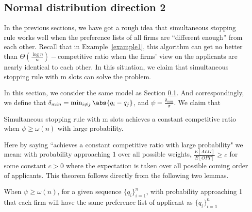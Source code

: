 \subsection{Normal distribution direction 2}


In the previous sections, we have got a rough idea that simultaneous stopping rule works well when the preference lists of all firms are ``different enough'' from each other.
Recall that in Example~\ref{example1}, this algorithm can get no better than $\Theta(\frac{\log n}{n})-$competitive ratio when the firms' view on the applicants are nearly identical to each other.
In this situation, we claim that simultaneous stopping rule with m slots can solve the problem.

In this section, we consider the same model as Section \ref{}.
And correspondingly, we
define that $\delta_{min} = \min_{i \neq j} \abs{q_i - q_j}$, and
$\psi = \frac{\delta_{min}}{\sigma}$.
We claim that


\begin{theorem} \label{northm2}
    Simultaneous stopping rule with m slots achieves a constant competitive
    ratio when $\psi \ge \omega(n)$ with large probability.
\end{theorem}

Here by saying ``achieves a constant competitive ratio with large probability" we mean:
with probability approaching 1 over all possible weights, 
$\frac{E[ALG]}{E[OPT]} \ge c$ for some constant $c > 0$ where 
the expectation is taken over all possible coming order of applicants.
This theorem follows directly from the following two lemmas.

\begin{lemma} \label{orderlem}
    When $\psi \ge \omega(n)$, for a given sequence $\{q_i\}_{i=1}^{n}$, with probability approaching 1 that
    each firm will have the same preference list of applicant as $\{q_i\}_{i=1}^{n}$

\end{lemma}


